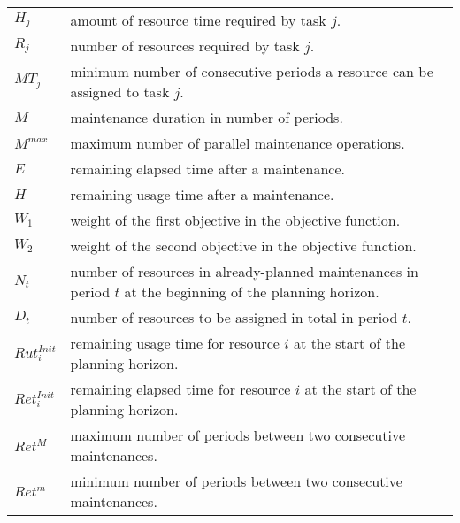 \documentclass[a4paper,onecolumn,fleqn]{article}
\begin{document}
    \begin{tabular}{p{8mm}p{167mm}}
        $H_j$             & amount of resource time required by task $j$. \\
        $R_j$             & number of resources required by task $j$. \\
        $MT_j$            & minimum number of consecutive periods a resource can be assigned to task $j$. \\
        $M$               & maintenance duration in number of periods. \\
        $M^{max}$         & maximum number of parallel maintenance operations. \\
        $E$               & remaining elapsed time after a maintenance. \\
        $H$               & remaining usage time after a maintenance. \\
        $W_1$             & weight of the first objective in the objective function. \\
        $W_2$             & weight of the second objective in the objective function. \\
        $N_t$             & number of resources in already-planned maintenances in period $t$ at the beginning of the planning horizon.\\
        $D_t$             & number of resources to be assigned in total in period $t$. \\
        $Rut^{Init}_{i}$  & remaining usage time for resource $i$ at the start of the planning horizon. \\
        $Ret^{Init}_{i}$  & remaining elapsed time for resource $i$ at the start of the planning horizon. \\
        $Ret^{M}$         & maximum number of periods between two consecutive maintenances. \\
        $Ret^{m}$         & minimum number of periods between two consecutive maintenances. \\
    \end{tabular}
\end{document}
